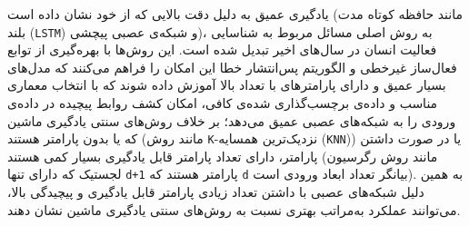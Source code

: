یادگیری عمیق
به دلیل دقت بالایی که از خود نشان داده است\cite{chen2021deep}
(مانند حافظه کوتاه مدت بلند (\verb;LSTM;) و شبکه‌ی عصبی پیچشی)،
به روش اصلی مسائل مربوط به شناسایی فعالیت انسان در سال‌های اخیر تبدیل شده است. این روش‌ها با بهره‌گیری از
توابع فعال‌ساز غیرخطی
و الگوریتم پس‌انتشار خطا\cite{rumelhart1986learning}
این امکان را فراهم می‌کنند که مدل‌های بسیار عمیق و دارای پارامترهای با تعداد بالا آموزش داده شوند که با انتخاب معماری مناسب و داده‌ی برچسب‌گذاری شده‌ی کافی، امکان کشف روابط پیچیده در داده‌ی ورودی را به شبکه‌های عصبی عمیق می‌دهد؛ بر خلاف روش‌های سنتی یادگیری ماشین که یا بدون پارامتر هستند (مانند روش \verb;K;-نزدیک‌ترین همسایه (\verb;KNN;))
یا در صورت داشتن پارامتر، دارای تعداد پارامتر قابل یادگیری بسیار کمی هستند
(مانند روش رگرسیون لجستیک که دارای تنها \verb|d+1| پارامتر هستند که \verb|d| بیانگر تعداد ابعاد ورودی است).
به همین دلیل شبکه‌های عصبی با داشتن تعداد زیادی پارامتر قابل یادگیری و پیچیدگی بالا، می‌توانند عملکرد به‌مراتب بهتری نسبت به روش‌های سنتی یادگیری ماشین نشان دهند.

